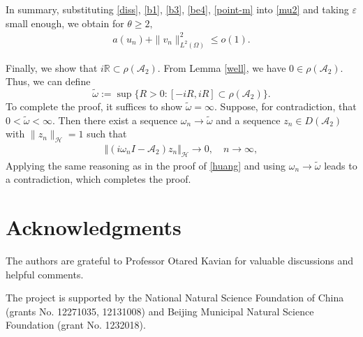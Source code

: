\documentclass[twoside]{article}
\theoremstyle{noparens}
\theoremstyle{definition}
\numberwithin{equation}{section}
\numberwithin{figure}{section}
\begin{document}
\noindent
In summary,  substituting \eqref{diss}, \eqref{b1}, \eqref{b3}, \eqref{be4}, \eqref{point-m} into \eqref{mu2} and taking $\varepsilon$ small enough, we obtain for $\theta\geq 2, $
\begin{align}\label{mu4}
	a(u_{n}) + \|v_n\|^2_{L^2(\Omega)} \leq   o(1).
\end{align}

Finally, we show that $i \mathbb R  \subset \rho(\mathcal A_2)$.
From Lemma \ref{well}, we have $0\in\rho({\mathcal{A}_2})$. Thus, we can define
$$\widetilde{\omega}:=\sup \{ R>0: [-iR, iR]\subset \rho(\mathcal{A}_2)\}.$$
To complete the proof, it suffices to show $\widetilde{\omega}=\infty$.
Suppose, for contradiction, that $0<\widetilde{\omega}<\infty$.
Then there exist a sequence
$\omega_n \to \widetilde{\omega}$  and a sequence
$z_n \in D(\mathcal{A}_2)$ with $\|z_n\|_\mathcal{H}=1$ such that
\begin{align}\label{+331-}
	\Vert (i\omega_n I-\mathcal{A}_2) z_n\Vert_\mathcal{H} \to 0,\quad n\to\infty,
\end{align}
Applying the same reasoning as in the proof of \eqref{huang} and using $\omega_n \to \widetilde{\omega}$ leads to a contradiction, which completes the proof.

\section*{Acknowledgments}
The authors are grateful to Professor Otared Kavian for valuable discussions and helpful comments.

The project is supported by the National Natural Science Foundation of China (grants No. 12271035, 12131008) and
Beijing Municipal Natural Science Foundation (grant No. 1232018).

%


\end{document}

